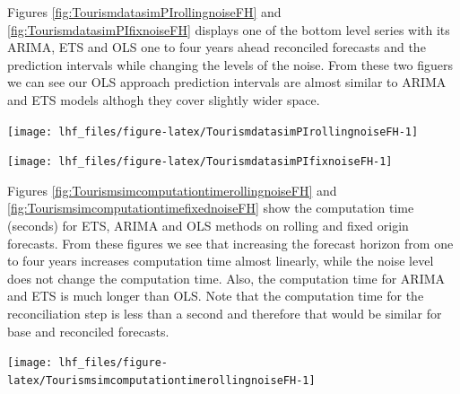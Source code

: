 \documentclass[11pt,a4paper,]{article}
\let\origfigure\figure
\let\endorigfigure\endfigure
\renewenvironment{figure}[1][2] {
    \expandafter\origfigure\expandafter[!htbp]
} {
    \endorigfigure
}
\begin{document}
Figures \ref{fig:TourismdatasimPIrollingnoiseFH} and \ref{fig:TourismdatasimPIfixnoiseFH} displays one of the bottom level series with its ARIMA, ETS and OLS one to four years ahead reconciled forecasts and the prediction intervals while changing the levels of the noise. From these two figuers we can see our OLS approach prediction intervals are almost similar to ARIMA and ETS models althogh they cover slightly wider space.

\begin{figure}

{\centering \texttt{[image: lhf\_files/figure-latex/TourismdatasimPIrollingnoiseFH-1]} 

}

\caption{The actual test set for one of the bottom level series with different error levels with reconciliation and prediction intervals for one to four years- Rolling origin - 304 bottom level series and 8 levels of hierarchy.}\label{fig:TourismdatasimPIrollingnoiseFH}
\end{figure}

\begin{figure}

{\centering \texttt{[image: lhf\_files/figure-latex/TourismdatasimPIfixnoiseFH-1]} 

}

\caption{The actual test set for one of the bottom level series with different error levels forecasted with reconciliation and prediction intervals for one to four years- Fixed origin - 304 bottom level series and 8 levels of hierarchy.}\label{fig:TourismdatasimPIfixnoiseFH}
\end{figure}

Figures \ref{fig:TourismsimcomputationtimerollingnoiseFH} and \ref{fig:TourismsimcomputationtimefixednoiseFH} show the computation time (seconds) for ETS, ARIMA and OLS methods on rolling and fixed origin forecasts. From these figures we see that increasing the forecast horizon from one to four years increases computation time almost linearly, while the noise level does not change the computation time. Also, the computation time for ARIMA and ETS is much longer than OLS. Note that the computation time for the reconciliation step is less than a second and therefore that would be similar for base and reconciled forecasts.

\begin{figure}

{\centering \texttt{[image: lhf\_files/figure-latex/TourismsimcomputationtimerollingnoiseFH-1]} 

}

\caption{Computation time (seconds) for ETS, ARIMA and OLS with reconciliation - Rolling  origin forecasts on one to four year test set and different error values - 304 bottom level series and 8 levels of hierarchy.}\label{fig:TourismsimcomputationtimerollingnoiseFH}
\end{figure}
\end{document}
